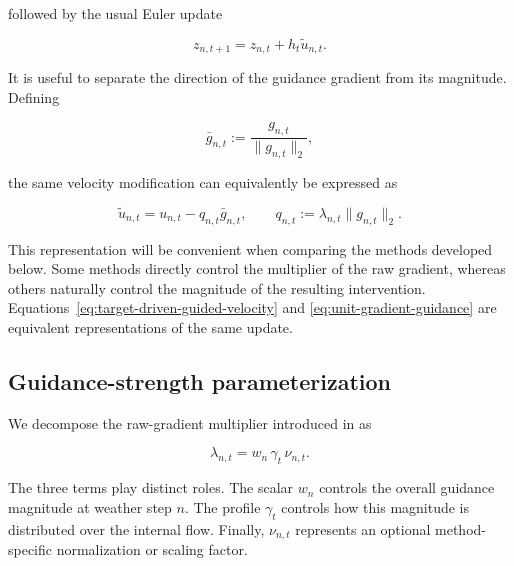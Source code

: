 followed by the usual Euler update

\begin{equation}
    z_{n,t+1}
    =
    z_{n,t}
    +
    h_t \tilde{u}_{n,t}.
    \label{eq:guided-euler-update}
\end{equation}

It is useful to separate the direction of the guidance gradient from its
magnitude. Defining

\begin{equation}
    \bar{g}_{n,t}
    :=
    \frac{g_{n,t}}{\lVert g_{n,t}\rVert_2},
    \label{eq:unit-guidance-gradient}
\end{equation}

the same velocity modification can equivalently be expressed as

\begin{equation}
    \tilde{u}_{n,t}
    =
    u_{n,t}
    -
    q_{n,t}\bar{g}_{n,t},
    \qquad
    q_{n,t}
    :=
    \lambda_{n,t}\lVert g_{n,t}\rVert_2 .
    \label{eq:unit-gradient-guidance}
\end{equation}

This representation will be convenient when comparing the methods developed
below. Some methods directly control the multiplier of the raw gradient,
whereas others naturally control the magnitude of the resulting intervention.
Equations~\eqref{eq:target-driven-guided-velocity} and
\eqref{eq:unit-gradient-guidance} are equivalent representations of the same
update.

\subsection{Guidance-strength parameterization}
\label{sec:guidance-strength-parameterization}

We decompose the raw-gradient multiplier introduced in
 as

\begin{equation}
    \lambda_{n,t}
    =
    w_n\,\gamma_t\,\nu_{n,t}.
    \label{eq:guidance-strength-decomposition}
\end{equation}

The three terms play distinct roles. The scalar \(w_n\) controls the overall
guidance magnitude at weather step \(n\). The profile \(\gamma_t\) controls
how this magnitude is distributed over the internal flow. Finally,
\(\nu_{n,t}\) represents an optional method-specific normalization or scaling
factor.

